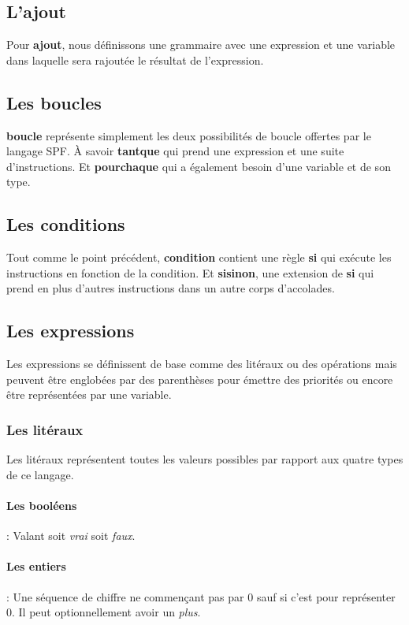\subsection{L'ajout}
Pour \textbf{ajout}, nous définissons une grammaire avec une expression et une variable dans laquelle sera rajoutée le résultat de l'expression.

\subsection{Les boucles}
\textbf{boucle} représente simplement les deux possibilités de boucle offertes par le langage SPF.
À savoir \textbf{tantque} qui prend une expression et une suite d'instructions. Et \textbf{pourchaque} qui a également besoin d'une variable et de son type.

\subsection{Les conditions}
Tout comme le point précédent, \textbf{condition} contient une règle \textbf{si} qui exécute les instructions en fonction de la condition.
Et \textbf{sisinon}, une extension de \textbf{si} qui prend en plus d'autres instructions dans un autre corps d'accolades.

\subsection{Les expressions}
Les expressions se définissent de base comme des litéraux ou des opérations mais peuvent être englobées par des parenthèses pour émettre des priorités ou encore être représentées par une variable.

\subsubsection{Les litéraux}
Les litéraux représentent toutes les valeurs possibles par rapport aux quatre types de ce langage.

\paragraph{Les booléens}: Valant soit \textit{vrai} soit \textit{faux}.

\paragraph{Les entiers}: Une séquence de chiffre ne commençant pas par 0 sauf si c'est pour représenter 0. Il peut optionnellement avoir un \textit{plus}.

